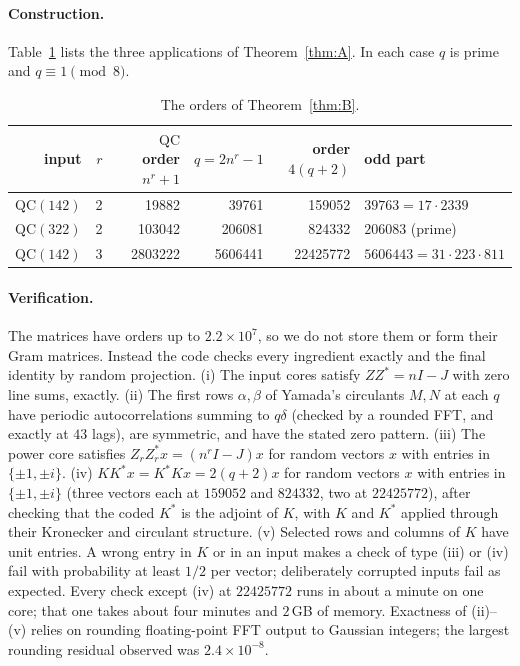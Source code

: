 \documentclass[10pt]{article}
\theoremstyle{remark}
\newcommand{\QC}{\mathrm{QC}}
\begin{document}
\paragraph{Construction.} Table~\ref{tab:orders} lists the three applications of Theorem~\ref{thm:A}. In each case $q$ is prime and $q\equiv1\pmod8$.

\begin{table}[h]
\centering
\begin{tabular}{rrrrrl}
\toprule
input & $r$ & $\QC$ order $n^r+1$ & $q=2n^r-1$ & order $4(q+2)$ & odd part\\
\midrule
$\QC(142)$ & 2 & 19882 & 39761 & 159052 & $39763=17\cdot2339$\\
$\QC(322)$ & 2 & 103042 & 206081 & 824332 & $206083$ (prime)\\
$\QC(142)$ & 3 & 2803222 & 5606441 & 22425772 & $5606443=31\cdot223\cdot811$\\
\bottomrule
\end{tabular}
\caption{The orders of Theorem~\ref{thm:B}.}\label{tab:orders}
\end{table}

\paragraph{Verification.} The matrices have orders up to $2.2\times10^7$, so we do not store them or form their Gram matrices. Instead the code checks every ingredient exactly and the final identity by random projection. (i) The input cores satisfy $ZZ^*=nI-J$ with zero line sums, exactly. (ii) The first rows $\alpha,\beta$ of Yamada's circulants $M,N$ at each $q$ have periodic autocorrelations summing to $q\delta$ (checked by a rounded FFT, and exactly at $43$ lags), are symmetric, and have the stated zero pattern. (iii) The power core satisfies $Z_rZ_r^*x=(n^rI-J)x$ for random vectors $x$ with entries in $\{\pm1,\pm i\}$. (iv) $KK^*x=K^*Kx=2(q+2)x$ for random vectors $x$ with entries in $\{\pm1,\pm i\}$ (three vectors each at $159052$ and $824332$, two at $22425772$), after checking that the coded $K^*$ is the adjoint of $K$, with $K$ and $K^*$ applied through their Kronecker and circulant structure. (v) Selected rows and columns of $K$ have unit entries. A wrong entry in $K$ or in an input makes a check of type (iii) or (iv) fail with probability at least $1/2$ per vector; deliberately corrupted inputs fail as expected. Every check except (iv) at $22425772$ runs in about a minute on one core; that one takes about four minutes and $2$\,GB of memory. Exactness of (ii)--(v) relies on rounding floating-point FFT output to Gaussian integers; the largest rounding residual observed was $2.4\times10^{-8}$.
\end{document}
